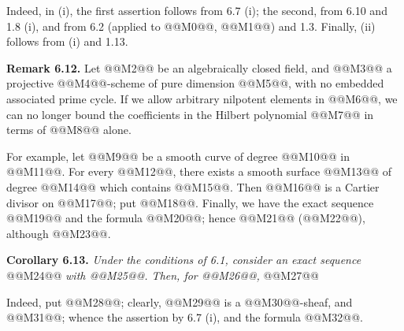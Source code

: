 Indeed, in (i), the first assertion follows from 6.7 (i); the second, from 6.10 and 1.8 (i), and from 6.2 (applied to @@M0@@, @@M1@@) and 1.3. Finally, (ii) follows from (i) and 1.13.

\textbf{Remark 6.12.} Let @@M2@@ be an algebraically closed field, and @@M3@@ a projective @@M4@@-scheme of pure dimension @@M5@@, with no embedded associated prime cycle. If we allow arbitrary nilpotent elements in @@M6@@, we can no longer bound the coefficients in the Hilbert polynomial @@M7@@ in terms of @@M8@@ alone.

For example, let @@M9@@ be a smooth curve of degree @@M10@@ in @@M11@@. For every @@M12@@, there exists a smooth surface @@M13@@ of degree @@M14@@ which contains @@M15@@. Then @@M16@@ is a Cartier divisor on @@M17@@; put @@M18@@. Finally, we have the exact sequence @@M19@@ and the formula @@M20@@; hence @@M21@@ (@@M22@@), although @@M23@@.

\textbf{Corollary 6.13.} \emph{Under the conditions of 6.1, consider an exact sequence}
@@M24@@
\emph{with @@M25@@. Then, for @@M26@@,}
@@M27@@

Indeed, put @@M28@@; clearly, @@M29@@ is a @@M30@@-sheaf, and @@M31@@; whence the assertion by 6.7 (i), and the formula @@M32@@.

